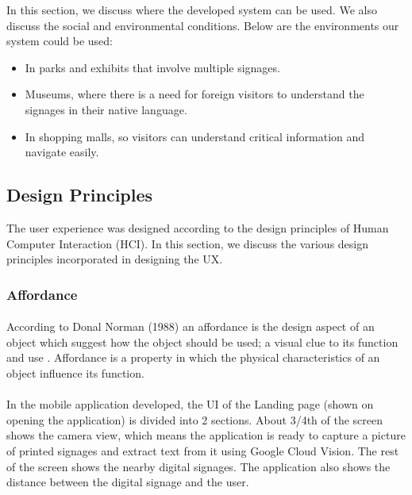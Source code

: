 \documentclass[12pt]{article}
\begin{document}
    In this section, we discuss where the developed system can be used. We also discuss the social and environmental conditions. Below are the environments our system could be used:
    
   
\begin{itemize}

 \item In parks and exhibits that involve multiple signages.
 
  \item Museums, where there is a need for foreign visitors to understand the signages in their native language.
 
  \item In shopping malls, so visitors can understand critical information and navigate easily.
  
  \end{itemize}
  
    \subsection{Design Principles}
    
    The user experience was designed according to the design principles of Human Computer Interaction (HCI). In this section, we discuss the various design principles incorporated in designing the UX. 
    
    \subsubsection{Affordance}
    \paragraph{}According to Donal Norman (1988) an affordance is the design aspect of an object which suggest how the object should be used; a visual clue to its function and use \cite{norman}. Affordance is a property in which the physical characteristics of an object influence its function. 
    
    \paragraph{} In the mobile application developed, the UI of the Landing page (shown on opening the application) is divided into 2 sections. About 3/4th of the screen shows the camera view, which means the application is ready to capture a picture of printed signages and extract text from it using Google Cloud Vision. The rest of the screen shows the nearby digital signages. The application also shows the distance between the digital signage and the user.
    
\end{document}
